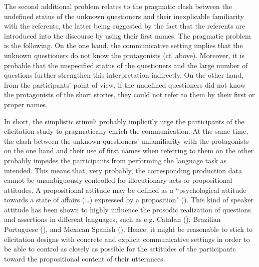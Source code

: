 \documentclass[output=paper]{langsci/langscibook}
\begin{document}
The second additional problem relates to the pragmatic clash between the undefined status of the unknown questioners and their inexplicable familiarity with the referents, the latter being suggested by the fact that the referents are introduced into the discourse by using their first names. The pragmatic problem is the following. On the one hand, the communicative setting implies that the unknown questioners do not know the protagonists (cf. above). Moreover, it is probable that the unspecified status of the questioners and the large number of questions further strengthen this interpretation indirectly. On the other hand, from the participants’ point of view, if the undefined questioners did not know the protagonists of the short stories, they could not refer to them by their first or proper names. 

In short, the simplistic stimuli probably implicitly urge the participants of the elicitation study to pragmatically enrich the communication. At the same time, the clash between the unknown questioners’ unfamiliarity with the protagonists on the one hand and their use of first names when referring to them on the other probably impedes the participants from performing the language task as intended. This means that, very probably, the corresponding production data cannot be unambiguously controlled for illocutionary acts or propositional attitudes. A propositional attitude may be defined as a ``psychological attitude towards a state of affairs (…) expressed by a proposition" (\citealt[47]{Moraes12}). This kind of speaker attitude has been shown to highly influence the prosodic realization of questions and assertions in different languages, such as e.g. Catalan (\citealt{Vanrell2014evidentiality,Roseano2015epistemic,Borras-Comes2015}), Brazilian Portuguese (\citealt{Moraes11,Moraes12}), and Mexican Spanish (\citealt{FliessbachReich14}). Hence, it might be reasonable to stick to elicitation designs with concrete and explicit communicative settings in order to be able to control as closely as possible for the attitudes of the participants toward the propositional content of their utterances. 
 
\end{document}
